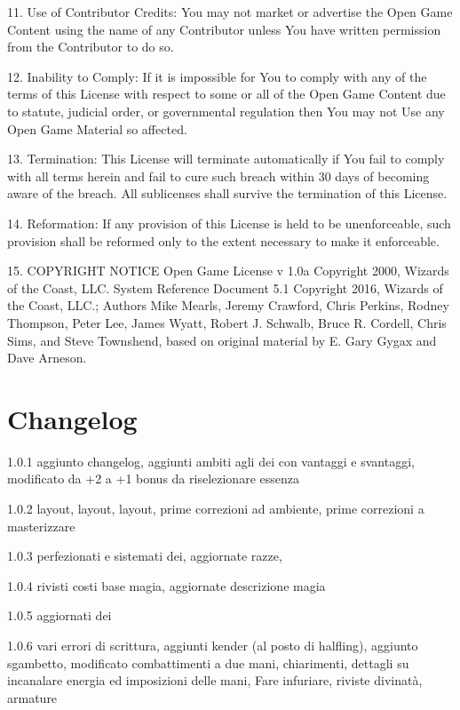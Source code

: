 \documentclass[a4paper,11pt,twoside,openany]{book}
\begin{document}
{{11. Use of Contributor Credits: You may not market or advertise the Open Game Content using the name of any Contributor unless You have written permission from the Contributor to do so.

12. Inability to Comply: If it is impossible for You to comply with any of the terms of this License with respect to some or all of the Open Game Content due to statute, judicial order, or governmental regulation then You may not Use any Open Game Material so affected.

13. Termination: This License will terminate automatically if You fail to comply with all terms herein and fail to cure such breach within 30 days of becoming aware of the breach. All sublicenses shall survive the termination of this License.

14. Reformation: If any provision of this License is held to be unenforceable, such provision shall be reformed only to the extent necessary to make it enforceable.

15. COPYRIGHT NOTICE Open Game License v 1.0a Copyright 2000, Wizards of the Coast, LLC. System Reference Document 5.1 Copyright 2016, Wizards of the Coast, LLC.; Authors Mike Mearls, Jeremy Crawford, Chris Perkins, Rodney Thompson, Peter Lee, James Wyatt, Robert J. Schwalb, Bruce R. Cordell, Chris Sims, and Steve Townshend, based on original material by E. Gary Gygax and Dave Arneson.}

\pagebreak

{\footnotesize
	\section{Changelog}

	1.0.1 aggiunto changelog, aggiunti ambiti agli dei con vantaggi e svantaggi, modificato da +2 a +1 bonus da riselezionare essenza

	1.0.2 layout, layout, layout, prime correzioni ad ambiente, prime correzioni a masterizzare

	1.0.3 perfezionati e sistemati dei, aggiornate razze,

	1.0.4 rivisti costi base magia, aggiornate descrizione magia

	1.0.5 aggiornati dei

	1.0.6 vari errori di scrittura, aggiunti kender (al posto di halfling), aggiunto sgambetto, modificato combattimenti a due mani, chiarimenti, dettagli su incanalare energia ed imposizioni delle mani, Fare infuriare, riviste divinatà, armature

}}
\end{document}
